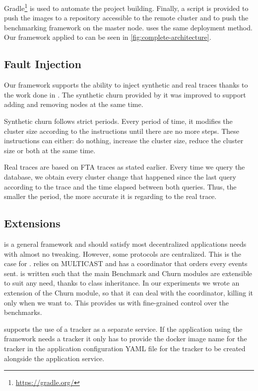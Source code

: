 Gradle\footnote{\href{https://gradle.org/}{https://gradle.org/}} is used to automate the project building. Finally, a script is provided to push the images to a repository accessible to the remote cluster and to push the benchmarking framework on the master node. \jgroups uses the same deployment method. Our framework applied to \epto can be seen in \autoref{fig:complete-architecture}.
\subsection{Fault Injection}
Our framework supports the ability to inject synthetic and real traces thanks to the work done in \autocite{vaucher2016erasure}. The synthetic churn provided by it was improved to support adding and removing nodes at the same time.

Synthetic churn follows strict periods. Every period of time, it modifies the cluster size according to the instructions until there are no more steps. These instructions can either: do nothing, increase the cluster size, reduce the cluster size or both at the same time.

Real traces are based on FTA traces as stated earlier. Every time we query the database, we obtain every cluster change that happened since the last query according to the trace and the time elapsed between both queries. Thus, the smaller the period, the more accurate it is regarding to the real trace.
\subsection{Extensions}
\eptotester is a general framework and should satisfy most decentralized applications needs with almost no tweaking. However, some protocols are centralized. This is the case for \jgroups. \jgroups relies on MULTICAST and has a coordinator that orders every events sent. \eptotester is written such that the main Benchmark and Churn modules are extensible to suit any need, thanks to class inheritance. In our experiments we wrote an extension of the Churn module, so that it can deal with the coordinator, killing it only when we want to. This provides us with fine-grained control over the benchmarks. 

\eptotester supports the use of a tracker as a separate service. If the application using the framework needs a tracker it only has to provide the docker image name for the tracker in the application configuration YAML file for the tracker to be created alongside the application service.
